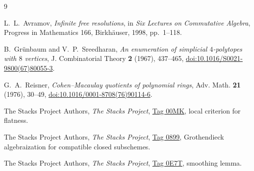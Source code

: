 \documentclass[11pt]{article}
\theoremstyle{definition}
\theoremstyle{remark}
\begin{document}
\begin{thebibliography}{9}

L.~L.~Avramov,
\emph{Infinite free resolutions}, in \emph{Six Lectures on Commutative
Algebra}, Progress in Mathematics 166, Birkh\"auser, 1998, pp.~1--118.

B.~Gr\"unbaum and V.~P.~Sreedharan,
\emph{An enumeration of simplicial $4$-polytopes with $8$ vertices},
J. Combinatorial Theory \textbf{2} (1967), 437--465,
\href{https://doi.org/10.1016/S0021-9800(67)80055-3}
{doi:10.1016/S0021-9800(67)80055-3}.

G.~A.~Reisner,
\emph{Cohen--Macaulay quotients of polynomial rings},
Adv. Math. \textbf{21} (1976), 30--49,
\href{https://doi.org/10.1016/0001-8708(76)90114-6}
{doi:10.1016/0001-8708(76)90114-6}.

The Stacks Project Authors,
\emph{The Stacks Project},
\href{https://stacks.math.columbia.edu/tag/00MK}{Tag 00MK}, local criterion
for flatness.

The Stacks Project Authors,
\emph{The Stacks Project},
\href{https://stacks.math.columbia.edu/tag/0899}{Tag 0899}, Grothendieck
algebraization for compatible closed subschemes.

The Stacks Project Authors,
\emph{The Stacks Project},
\href{https://stacks.math.columbia.edu/tag/0E7T}{Tag 0E7T}, smoothing lemma.

\end{thebibliography}
\end{document}
